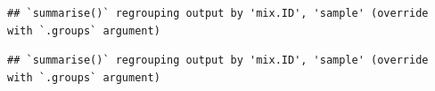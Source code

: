 \documentclass[
]{article}
\newenvironment{Shaded}{\begin{snugshade}}{\end{snugshade}}
\newcommand{\DataTypeTok}[1]{\textcolor[rgb]{0.13,0.29,0.53}{#1}}
\newcommand{\KeywordTok}[1]{\textcolor[rgb]{0.13,0.29,0.53}{\textbf{#1}}}
\newcommand{\NormalTok}[1]{#1}
\newcommand{\OperatorTok}[1]{\textcolor[rgb]{0.81,0.36,0.00}{\textbf{#1}}}
\newcommand{\StringTok}[1]{\textcolor[rgb]{0.31,0.60,0.02}{#1}}
\begin{document}
\begin{verbatim}
## `summarise()` regrouping output by 'mix.ID', 'sample' (override with `.groups` argument)
\end{verbatim}

\begin{Shaded}
\end{Shaded}

\begin{verbatim}
## `summarise()` regrouping output by 'mix.ID', 'sample' (override with `.groups` argument)
\end{verbatim}
\end{document}
